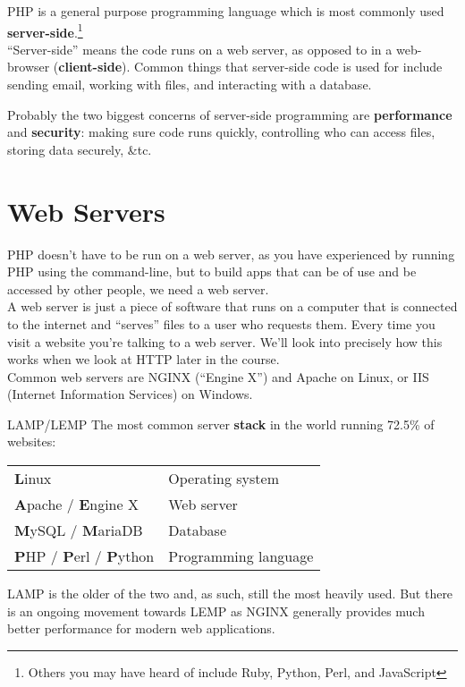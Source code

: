 PHP is a general purpose programming language which is most commonly used \textbf{server-side}.\footnote{Others you may have heard of include Ruby, Python, Perl, and JavaScript}
\\

``Server-side'' means the code runs on a web server, as opposed to in a web-browser (\textbf{client-side}). Common things that server-side code is used for include sending email, working with files, and interacting with a database.


Probably the two biggest concerns of server-side programming are \textbf{performance} and \textbf{security}: making sure code runs quickly, controlling who can access files, storing data securely, \&tc.

\section{Web Servers}

PHP doesn't have to be run on a web server, as you have experienced by running PHP using the command-line, but to build apps that can be of use and be accessed by other people, we need a web server.
\\

A web server is just a piece of software that runs on a computer that is connected to the internet and ``serves'' files to a user who requests them. Every time you visit a website you're talking to a web server. We'll look into precisely how this works when we look at HTTP later in the course.
\\

Common web servers are NGINX (``Engine X'') and Apache on Linux, or IIS (Internet Information Services) on Windows.

\begin{infobox}{LAMP/LEMP}
    The most common server \textbf{stack} in the world running 72.5\% of websites:
    \\

    \begin{tabu}{l X}
        \textbf{L}inux  &   Operating system \\
        \textbf{A}pache / \textbf{E}ngine X   &   Web server \\
        \textbf{M}ySQL / \textbf{M}ariaDB &   Database \\
        \textbf{P}HP / \textbf{P}erl / \textbf{P}ython    &   Programming language \\
    \end{tabu}

    \par\bigskip

    LAMP is the older of the two and, as such, still the most heavily used. But there is an ongoing movement towards LEMP as NGINX generally provides much better performance for modern web applications.
\end{infobox}

